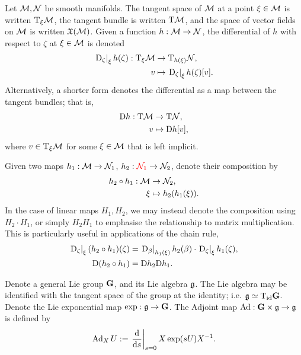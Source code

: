 \documentclass{article}
\newcommand\at[2]{\left.#1\right|_{#2}}
\newcommand{\dds}{\frac{\td}{\td s}}
\begin{document}
Let $\mathcal{M}, \mathcal{N}$ be smooth manifolds.
The tangent space of $\mathcal{M}$ at a point $\xi \in \mathcal{M}$ is written $\mathrm{T}_\xi \mathcal{M}$, the tangent bundle is written $\mathrm{T} \mathcal{M}$, and the space of vector fields on $\mathcal{M}$ is written $\mathfrak{X}(\mathcal{M})$.
Given a function $h: \mathcal{M} \to \mathcal{N}$, the differential of $h$ with respect to $\zeta$ at $\xi \in \mathcal{M}$ is denoted
\begin{align*}
    \at{\tD_\zeta}{\xi} h(\zeta) : \tT_\xi \calM &\to \tT_{h(\xi)} \calN, \\
    v &\mapsto \at{\tD_\zeta}{\xi} h(\zeta)[v].
\end{align*}
Alternatively, a shorter form denotes the differential as a map between the tangent bundles; that is,
\begin{align*}
    \mathrm{D} h : \mathrm{T} \mathcal{M} &\to \mathrm{T} \mathcal{N}, \\
    v &\mapsto \mathrm{D} h [v],
\end{align*}
where $v \in \mathrm{T}_\xi \mathcal{M}$ for some $\xi \in \mathcal{M}$ that is left implicit.

Given two maps $h_1 : \mathcal{M} \to \mathcal{N}_1$, $h_2 : {\color{red} \mathcal{N}_1} \to \mathcal{N}_2$, denote their composition by
\begin{align*}
    h_2 \circ h_1 : \mathcal{M} &\to \mathcal{N}_2, \\
    \xi &\mapsto h_2(h_1(\xi)).
\end{align*}
In the case of linear maps $H_1, H_2$, we may instead denote the composition using $H_2 \cdot H_1$, or simply $H_2 H_1$ to emphasise the relationship to matrix multiplication.
This is particularly useful in applications of the chain rule,
\begin{align*}
    \at{\tD_\zeta}{\xi} (h_2 \circ h_1) (\zeta) &= \at{\tD_\beta}{h_1(\xi)} h_2(\beta) \cdot \at{\tD_\zeta}{\xi} h_1(\zeta), \\
    \tD (h_2 \circ h_1) &= \tD h_2 \tD h_1.
\end{align*}

Denote a general Lie group $\mathbf{G}$, and its Lie algebra $\mathfrak{g}$.
The Lie algebra may be identified with the tangent space of the group at the identity; i.e. $\mathfrak{g} \simeq \mathrm{T}_{\mathrm{id}} \mathbf{G}$.
Denote the Lie exponential map $\exp: \mathfrak{g} \to \mathbf{G}$.
The Adjoint map $\operatorname{Ad}: \mathbf{G} \times \mathfrak{g} \to \mathfrak{g}$ is defined by
\begin{align*}
    \Ad_X U := \at{\dds}{s=0} X \exp(s U) X^{-1}.
\end{align*}
\end{document}
